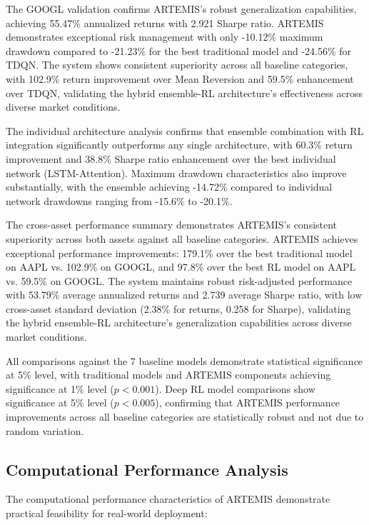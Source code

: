 \documentclass[10pt,twocolumn]{article}
\begin{document}
The GOOGL validation confirms ARTEMIS's robust generalization capabilities, achieving 55.47\% annualized returns with 2.921 Sharpe ratio. ARTEMIS demonstrates exceptional risk management with only -10.12\% maximum drawdown compared to -21.23\% for the best traditional model and -24.56\% for TDQN. The system shows consistent superiority across all baseline categories, with 102.9\% return improvement over Mean Reversion and 59.5\% enhancement over TDQN, validating the hybrid ensemble-RL architecture's effectiveness across diverse market conditions.

The individual architecture analysis confirms that ensemble combination with RL integration significantly outperforms any single architecture, with 60.3\% return improvement and 38.8\% Sharpe ratio enhancement over the best individual network (LSTM-Attention). Maximum drawdown characteristics also improve substantially, with the ensemble achieving -14.72\% compared to individual network drawdowns ranging from -15.6\% to -20.1\%.

The cross-asset performance summary demonstrates ARTEMIS's consistent superiority across both assets against all baseline categories. ARTEMIS achieves exceptional performance improvements: 179.1\% over the best traditional model on AAPL vs. 102.9\% on GOOGL, and 97.8\% over the best RL model on AAPL vs. 59.5\% on GOOGL. The system maintains robust risk-adjusted performance with 53.79\% average annualized returns and 2.739 average Sharpe ratio, with low cross-asset standard deviation (2.38\% for returns, 0.258 for Sharpe), validating the hybrid ensemble-RL architecture's generalization capabilities across diverse market conditions.

All comparisons against the 7 baseline models demonstrate statistical significance at 5\% level, with traditional models and ARTEMIS components achieving significance at 1\% level ($p < 0.001$). Deep RL model comparisons show significance at 5\% level ($p < 0.005$), confirming that ARTEMIS performance improvements across all baseline categories are statistically robust and not due to random variation.

\subsection{Computational Performance Analysis}

The computational performance characteristics of ARTEMIS demonstrate practical feasibility for real-world deployment:
\end{document}
